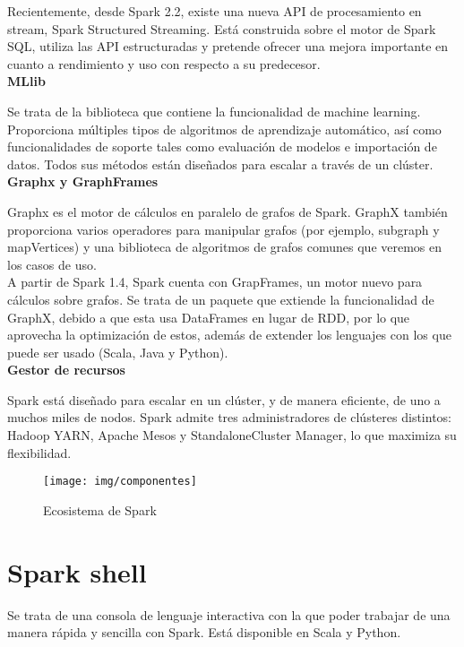 Recientemente, desde Spark 2.2, existe una nueva API de procesamiento en stream, Spark Structured Streaming. Está construida sobre el motor de Spark SQL, utiliza las API estructuradas y pretende ofrecer una mejora importante en cuanto a rendimiento y uso con respecto a su predecesor.\\

\textbf{MLlib}

Se trata de la biblioteca que contiene la funcionalidad de machine learning. Proporciona múltiples tipos de algoritmos de aprendizaje automático, así como funcionalidades de soporte tales como evaluación de modelos e importación de datos. Todos sus métodos están diseñados para escalar a través de un clúster.\\

\textbf{Graphx y GraphFrames}

Graphx es el motor de cálculos en paralelo de grafos de Spark. GraphX también proporciona varios operadores para manipular grafos (por ejemplo, subgraph y mapVertices) y una biblioteca de algoritmos de grafos comunes que veremos en los casos de uso.\\

A partir de Spark 1.4, Spark cuenta con GrapFrames, un motor nuevo  para cálculos sobre grafos. Se trata de un paquete que extiende la funcionalidad de GraphX, debido a que esta  usa DataFrames en lugar de RDD, por lo que aprovecha la optimización de estos, además de extender los lenguajes con los que puede ser usado (Scala, Java y Python).\\

\textbf{Gestor de recursos}

Spark está diseñado para escalar en un clúster, y de manera eficiente, de uno a muchos miles de nodos. Spark admite tres administradores de clústeres distintos: Hadoop YARN, Apache Mesos y StandaloneCluster Manager, lo que maximiza su flexibilidad. \\

\begin{figure}[H]
	\texttt{[image: img/componentes]}
	\caption{Ecosistema de Spark}
	\label{foto}
\end{figure}

\section{Spark shell}
Se trata de una consola de lenguaje interactiva con la que poder trabajar de una manera rápida y sencilla con Spark. Está disponible en Scala y Python.\\

